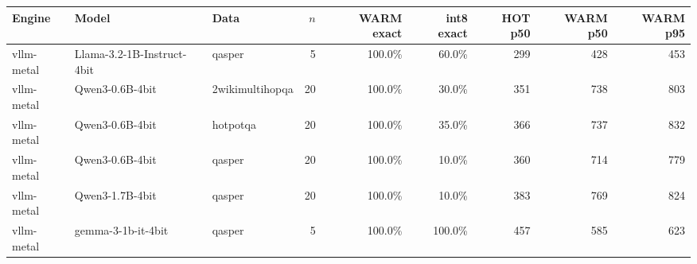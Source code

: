 \begin{tabular}{lllrrrrrr}
\toprule
Engine & Model & Data & $n$ & WARM exact & int8 exact & HOT p50 & WARM p50 & WARM p95 \\
\midrule
vllm-metal & Llama-3.2-1B-Instruct-4bit & qasper & 5 & 100.0\% & 60.0\% & 299 & 428 & 453 \\
vllm-metal & Qwen3-0.6B-4bit & 2wikimultihopqa & 20 & 100.0\% & 30.0\% & 351 & 738 & 803 \\
vllm-metal & Qwen3-0.6B-4bit & hotpotqa & 20 & 100.0\% & 35.0\% & 366 & 737 & 832 \\
vllm-metal & Qwen3-0.6B-4bit & qasper & 20 & 100.0\% & 10.0\% & 360 & 714 & 779 \\
vllm-metal & Qwen3-1.7B-4bit & qasper & 20 & 100.0\% & 10.0\% & 383 & 769 & 824 \\
vllm-metal & gemma-3-1b-it-4bit & qasper & 5 & 100.0\% & 100.0\% & 457 & 585 & 623 \\
\bottomrule
\end{tabular}
